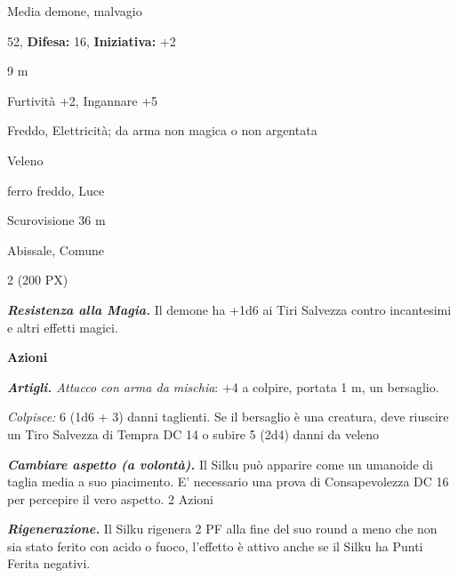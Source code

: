 \begin{multicols}{2}
{
\noindent
\begin{description}[noitemsep, topsep=0pt, parsep=0pt, partopsep=0pt, leftmargin=0cm, labelwidth=2.2cm]
	\item[\textbf{Taglia/Tipo:}] Media demone, malvagio
	\item[\textbf{Caratt.:}] 
	\item[\textbf{Punti Ferita:}] 52,  \textbf{Difesa:} 16,  \textbf{Iniziativa:} +2
	\item[\textbf{Movimento:}] 9 m
	\item[\textbf{Tiri Salvez.:}] 
	\item[\textbf{Comp.:}] Furtività +2, Ingannare +5
	\item[\textbf{Res. Danni:}] Freddo, Elettricità; da arma non magica o non argentata
	\item[\textbf{Imm. Danni:}] Veleno
	\item[\textbf{Vulnerabilità:}] ferro freddo, Luce
	\item[\textbf{Sensi:}] Scurovisione 36 m
	\item[\textbf{Linguaggi:}] Abissale, Comune
	\item[\textbf{Sfida:}] 2 (200 PX)\smallskip
\end{description}

\emph{\textbf{Resistenza alla Magia.}} Il demone ha +1d6 ai Tiri Salvezza contro incantesimi e altri effetti magici.

\textbf{Azioni}

\emph{\textbf{Artigli.} Attacco con arma da mischia}: +4 a colpire, portata 1 m, un bersaglio.

\emph{Colpisce:} 6 (1d6 + 3) danni taglienti. Se il bersaglio è una creatura, deve riuscire un Tiro Salvezza di Tempra DC 14 o subire 5 (2d4) danni da veleno

\emph{\textbf{Cambiare aspetto (a volontà).}} Il Silku può apparire come un umanoide di taglia media a suo piacimento. E' necessario una prova di Consapevolezza DC 16 per percepire il vero aspetto. 2 Azioni

\emph{\textbf{Rigenerazione.}} Il Silku rigenera 2 PF alla fine del suo round a meno che non sia stato ferito con acido o fuoco, l'effetto è attivo anche se il Silku ha Punti Ferita negativi.

}
\end{multicols}
